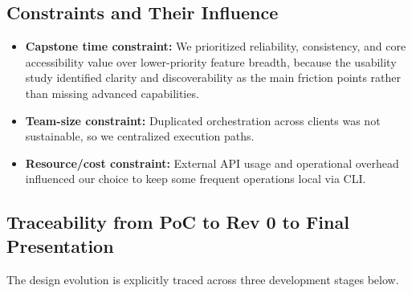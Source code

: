 \documentclass{article}
\begin{document}
\subsection{Constraints and Their Influence}

\begin{itemize}
	\item \textbf{Capstone time constraint:} We prioritized reliability,
	consistency, and core accessibility value over lower-priority feature breadth,
	because the usability study identified clarity and discoverability as the main
	friction points rather than missing advanced capabilities.
	\item \textbf{Team-size constraint:} Duplicated orchestration across clients was
	not sustainable, so we centralized execution paths.
	\item \textbf{Resource/cost constraint:} External API usage and operational
	overhead influenced our choice to keep some frequent operations local via CLI.
\end{itemize}

\subsection{Traceability from PoC to Rev 0 to Final Presentation}

The design evolution is explicitly traced across three development stages below.
\end{document}
